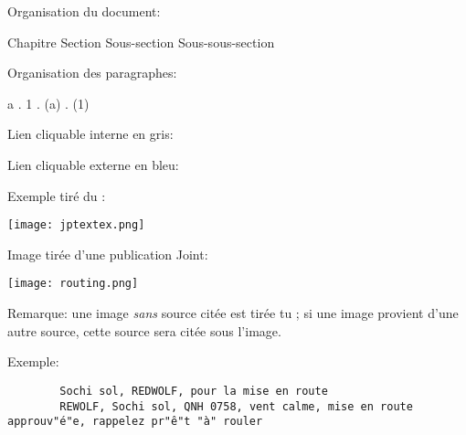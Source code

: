
%

\begin{e1}
	\item Organisation du document:

	{\Large Chapitre} {\large Section} Sous-section {\small Sous-sous-section}

	\item Organisation des paragraphes:

	{\Large a} . {\large 1} . (a) . {\small (1)}
	
	\item Lien cliquable interne en \textcolor{\intlink}{gris}:
	
	
	\item Lien cliquable externe en \textcolor{\extlink}{bleu}:
	
	\thirdwing
	

	\item Exemple tiré du \jp{}:

	\texttt{[image: jptextex.png]}

	\item Image tirée d'une publication Joint:

	\texttt{[image: routing.png]}
	
	Remarque: une image \emph{sans} source citée est tirée tu \jp{}; si une image provient d'une autre source, cette source sera citée sous l'image.

	\item Exemple:
	\begin{lstlisting}
		Sochi sol, REDWOLF, pour la mise en route
		REWOLF, Sochi sol, QNH 0758, vent calme, mise en route approuv"é"e, rappelez pr"ê"t "à" rouler
	\end{lstlisting}


\end{e1}
